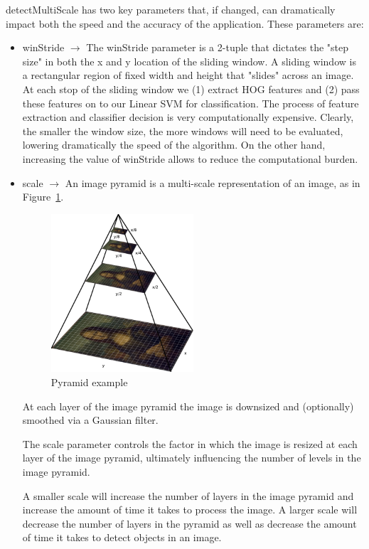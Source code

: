 detectMultiScale has two key parameters that, if changed, can dramatically
impact both the speed and the accuracy of the application. These parameters
are:
\begin{itemize}
\item winStride $\rightarrow$ The winStride parameter is a 2-tuple
	that dictates the "step size" in both the x and y location
	of the sliding window. A sliding window is a
	rectangular region of fixed width and height that
	"slides" across an image.
	At each stop of the sliding window we (1) extract HOG features and
	(2) pass these features on to our Linear SVM for
	classification. The process of feature extraction
	and classifier decision is very computationally expensive.
	Clearly, the smaller the window size, the more windows will
	need to be evaluated, lowering dramatically the
	speed of the algorithm. On the other hand,
	increasing the value of winStride allows to reduce
	the computational burden.
\item scale $\rightarrow$ 
An image pyramid is a multi-scale representation of an image, as in
Figure~\ref{fig:pyramid}.
\begin{figure}
\centering
\includegraphics[width=0.5\textwidth]{pyramid_example.png}
\caption{\label{fig:pyramid}Pyramid example}
\end{figure}

At each layer of the image pyramid the image is downsized and (optionally)
smoothed via a Gaussian filter.

The scale parameter controls the factor in which the image is resized at each
layer of the image pyramid, ultimately influencing the number of levels in the
image pyramid.

A smaller scale will increase the number of layers in the image pyramid and
increase the amount of time it takes to process the image.
A larger scale will decrease the number of layers in the pyramid as
well as decrease the amount of time it takes to detect objects in an image.

\end{itemize}

